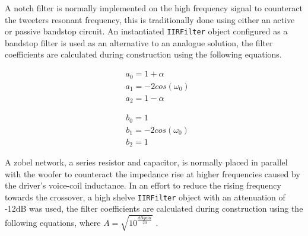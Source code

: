 \documentclass[main.tex]{subfiles}
\begin{document}
\medskip
A notch filter is normally implemented on the high frequency signal to counteract the tweeters resonant frequency, this is traditionally done using either an active or passive bandstop circuit.
An instantiated \lstinline{IIRFilter} object configured as a bandstop filter is used as an alternative to an analogue solution, the filter coefficients are calculated during construction using the following equations.

\begin{center}
\noindent\begin{minipage}{.3\linewidth}
    \begin{equation*}
        \begin{aligned} 
            &a_0 = 1 + \alpha \\
            &a_1 = -2cos(\omega _0) \\
            &a_2 = 1 - \alpha
        \end{aligned}
    \end{equation*}
    \end{minipage}%
    \begin{minipage}{.3\linewidth}
    \begin{equation*}
        \begin{aligned}
            &b_0 = 1 \\
            &b_1 = -2cos(\omega _0) \\
            &b_2 = 1 
        \end{aligned}
    \end{equation*}
\end{minipage}
\end{center}

\medskip
A zobel network, a series resistor and capacitor, is normally placed in parallel with the woofer to counteract the impedance rise at higher frequencies caused by the driver's voice-coil inductance. 
In an effort to reduce the rising frequency towards the crossover, a high shelve \lstinline{IIRFilter} object with an attenuation of -12dB was used, the filter coefficients are calculated during construction using the following equations, 
where $A = \sqrt{10^{\frac{dBgain}{20}}}$ .
\end{document}
